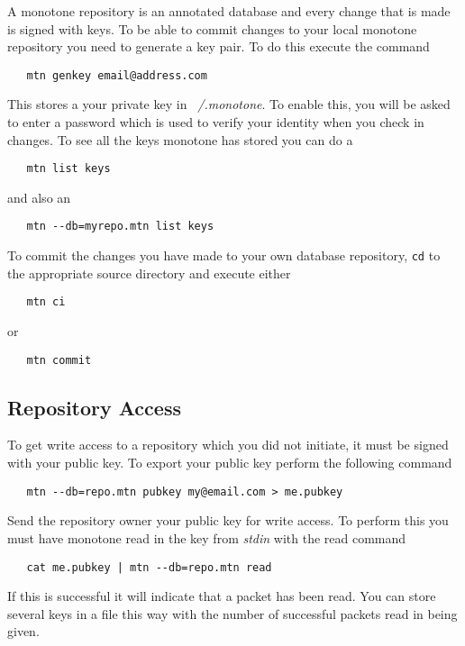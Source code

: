 \documentclass[12pt]{article}
\begin{document}
A monotone repository is an annotated database and every change that is made is signed with keys. To be able to commit changes to your local monotone repository you need to generate a key pair. To do this execute the command
\begin{verbatim}
   mtn genkey email@address.com 
\end{verbatim}
This stores a your private key in {\it ~/.monotone}. To enable this, you will be asked to enter a password which is used to verify your identity when you check in changes. To see all the keys monotone has stored you can do a
\begin{verbatim}
   mtn list keys 
\end{verbatim}
and also an
\begin{verbatim}
   mtn --db=myrepo.mtn list keys 
\end{verbatim}
To commit the changes you have made to your own database repository, {\tt cd} to the appropriate source directory and execute either
\begin{verbatim}
   mtn ci
\end{verbatim}
or
\begin{verbatim}
   mtn commit 
\end{verbatim}

\subsection*{Repository Access}

To get write access to a repository which you did not initiate, it must be signed with your public key. To export your public key perform the following command
\begin{verbatim}
   mtn --db=repo.mtn pubkey my@email.com > me.pubkey 
\end{verbatim}
Send the repository owner your public key for write access. To perform this you must have monotone read in the key from {\it stdin} with the read command
\begin{verbatim}
   cat me.pubkey | mtn --db=repo.mtn read 
\end{verbatim}
If this is successful it will indicate that a packet has been read. You can store several keys in a file this way with the number of successful packets read in being given. 

\end{document}
